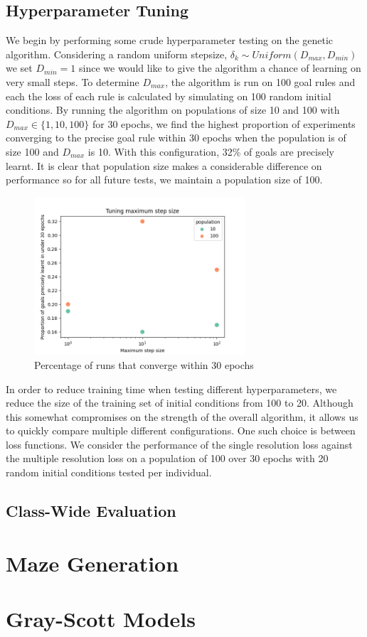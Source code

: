 \subsection{Hyperparameter Tuning}\label{sub:hyperparameter-tuning}

We begin by performing some crude hyperparameter testing on the genetic algorithm. Considering a random uniform stepsize, $\delta_k \sim \mathit{Uniform}(D_{max}, D_{min})$ we set $D_{min} = 1$ since we would like to give the algorithm a chance of learning on very small steps. To determine $D_{max}$, the algorithm is run on 100 goal rules and each the loss of each rule is calculated by simulating on 100 random initial conditions. By running the algorithm on populations of size 10 and 100 with $D_{max} \in \{1, 10, 100\}$ for 30 epochs, we find the highest proportion of experiments converging to the precise goal rule within 30 epochs when the population is of size 100 and $D_{max}$ is 10. With this configuration, 32\% of goals are precisely learnt. It is clear that population size makes a considerable difference on performance so for all future tests, we maintain a population size of 100.\\

\begin{figure}[!h]
\centering
\includegraphics[width=0.7\textwidth]{images/tune-max-step.png}
\caption{Percentage of runs that converge within 30 epochs}
\label{fig:tune-max-step}
\end{figure}

In order to reduce training time when testing different hyperparameters, we reduce the size of the training set of initial conditions from 100 to 20. Although this somewhat compromises on the strength of the overall algorithm, it allows us to quickly compare multiple different configurations. One such choice is between loss functions. We consider the performance of the single resolution loss against the multiple resolution loss on a population of 100 over 30 epochs with 20 random initial conditions tested per individual.\\    


\subsection{Class-Wide Evaluation}

\section{Maze Generation}

\section{Gray-Scott Models}